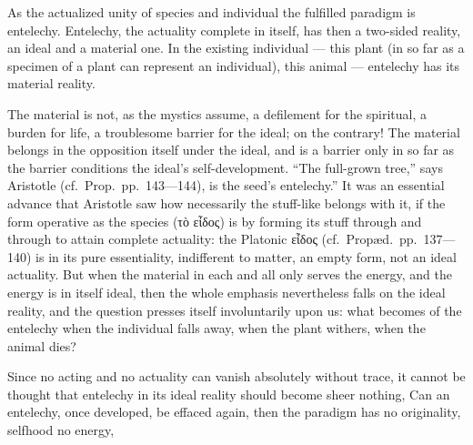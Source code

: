 \documentclass[12pt,a4paper]{book}
\begin{document}
As the actualized unity of species and individual the fulfilled paradigm is
entelechy. Entelechy, the actuality complete in itself, has then a two-sided
reality, an ideal and a material one. In the existing individual --- this plant
(in so far as a specimen of a plant can represent an individual), this animal
--- entelechy has its material reality.

The material is not, as the mystics assume, a defilement for the spiritual, a
burden for life, a troublesome barrier for the ideal; on the contrary! The
material belongs in the opposition itself under the ideal, and is a barrier
only in so far as the barrier conditions the ideal's self-development. ``The
full-grown tree,'' says Aristotle (cf.\ Prop.\ pp.~143---144), is the seed's
entelechy.''
It was an essential advance that Aristotle saw how necessarily the stuff-like
belongs with it, if the form operative as the species (τὸ εἶδος) is by forming
its stuff through and through to attain complete actuality: the Platonic εἶδος
(cf.\ Propæd.\ pp.~137---140) is in its pure essentiality, indifferent to
matter, an empty form, not an ideal actuality. But when the material in each
and all only serves the energy, and the energy is in itself ideal, then the
whole emphasis nevertheless falls on the ideal reality, and the question presses
itself involuntarily upon us: what becomes of the entelechy when the individual
falls away, when the plant withers, when the animal dies?

Since no acting and no actuality can vanish absolutely without trace, it cannot
be thought that entelechy in its ideal reality should become sheer nothing,
Can an entelechy, once developed, be effaced again, then the paradigm has no
originality, selfhood no energy,
\end{document}

